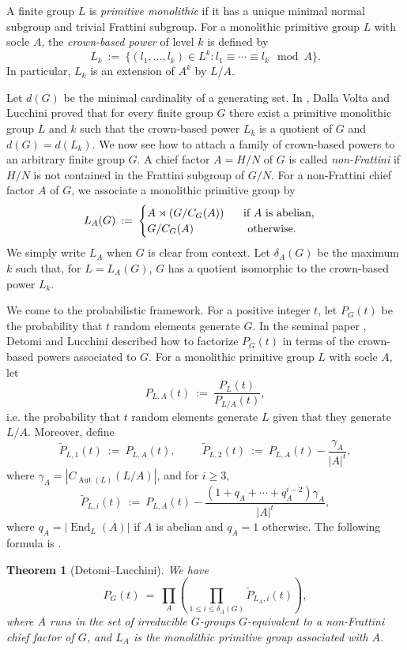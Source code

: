 \documentclass[11pt,reqno]{amsart}
\numberwithin{equation}{section}
\newtheorem{theorem}{Theorem}[section]
\theoremstyle{definition}
\theoremstyle{remark}
\newcommand{\Aut}{\mathop{\mathrm{Aut}}}
\newcommand{\End}{\mathop{\mathrm{End}}}
\begin{document}
A finite group $L$ is \emph{primitive monolithic} if it has a unique minimal normal subgroup and trivial Frattini subgroup.
For a monolithic primitive group $L$ with socle $A$,
the \emph{crown-based power} of level $k$ is defined by
$$ L_k \> := \> \{ (l_1,\ldots,l_k) \in L^k : l_1 \equiv \cdots \equiv l_k \mod A \} . $$
In particular, $L_k$ is an extension of $A^k$ by $L/A$.

Let $d(G)$ be the minimal cardinality of a generating set.
In \cite{DVL98}, Dalla Volta and Lucchini proved that for every finite group $G$
there exist a primitive monolithic group $L$ and $k$
such that the crown-based power $L_k$ is a quotient of $G$ and $d(G) = d(L_k)$.
We now see how to attach a family of crown-based powers to an arbitrary finite group $G$.
A chief factor $A = H/N$ of $G$ is called \emph{non-Frattini} if $H/N$ is not contained in the Frattini subgroup of $G/N$.
For a non-Frattini chief factor $A$ of $G$, we associate a monolithic primitive group by
$$ L_A(G) \> := \> 
\begin{cases}
  A \rtimes (G/C_G(A)) \hspace{0.5cm} \text{ if } A \text{ is abelian,}  \\
 G/C_G(A) \hspace{1.6cm} \text{ otherwise.}  
\end{cases} $$
We simply write $L_A$ when $G$ is clear from context.
Let $\delta_A(G)$ be the maximum $k$ such that, for $L = L_A(G)$,
$G$ has a quotient isomorphic to the crown-based power $L_k$.

We come to the probabilistic framework.
For a positive integer $t$, let $P_G(t)$ be the probability that $t$ random elements generate $G$.
In the seminal paper \cite{DL03},
Detomi and Lucchini described how to factorize $P_G(t)$ in terms of the crown-based powers associated to $G$.
For a monolithic primitive group $L$ with socle $A$, let
$$ P_{L,A}(t) \> := \> \frac{P_L(t)}{P_{L/A}(t)} , $$
i.e. the probability that $t$ random elements generate $L$ given that they generate $L/A$.
 Moreover, define
$$ \widetilde{P}_{L,1}(t) \> := \> P_{L,A}(t) , \hspace{1cm} 
\widetilde{P}_{L,2}(t) \> := \> P_{L,A}(t) - \frac{\gamma_A}{|A|^t} , $$ 
where $\gamma_A = |C_{\Aut(L)}(L/A)|$, and for $i \geq 3$,
$$ \widetilde{P}_{L,i}(t) \> := \> P_{L,A}(t) - \frac{(1+q_A+\cdots+q_A^{i-2})\gamma_A}{|A|^t} , $$ 
where $q_A = |\End_L(A)|$ if $A$ is abelian and $q_A =1$ otherwise.
The following formula is \cite[Theorem~18]{DL03}.

\begin{theorem}[Detomi--Lucchini] \label{thDL}
We have
$$ P_G(t) \> = \>
\prod_{A} \left( \prod_{1 \leq i \leq \delta_A(G)} \widetilde{P}_{L_A,i}(t) \right) , $$
where $A$ runs in the set of irreducible $G$-groups $G$-equivalent to a non-Frattini
chief factor of $G$,
and $L_A$ is the monolithic primitive group associated with $A$.
\end{theorem}
\end{document}
